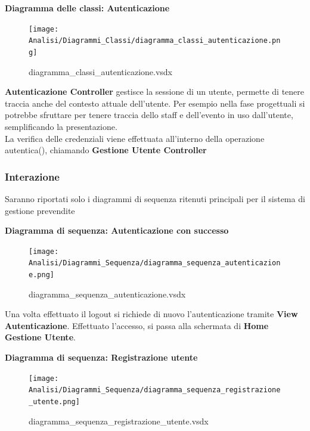 \documentclass[a4paper]{article}
\begin{document}
\newpage

\textbf{Diagramma delle classi: Autenticazione}

\begin{figure}[H]
    \texttt{[image: Analisi/Diagrammi\_Classi/diagramma\_classi\_autenticazione.png]}
    \centering
    \caption{diagramma\_classi\_autenticazione.vsdx}
\end{figure}

\textbf{Autenticazione Controller} gestisce la sessione di un utente, permette di tenere traccia anche del contesto attuale dell'utente. Per esempio nella fase progettuali si potrebbe sfruttare per tenere traccia dello staff e dell'evento in uso dall'utente, semplificando la presentazione.\\ La verifica delle credenziali viene effettuata all'interno della operazione autentica(), chiamando \textbf{Gestione Utente Controller}

\newpage

\subsubsection{Interazione}


Saranno riportati solo i diagrammi di sequenza ritenuti principali per il sistema di gestione prevendite

\textbf{Diagramma di sequenza: Autenticazione con successo}

\begin{figure}[H]
    \texttt{[image: Analisi/Diagrammi\_Sequenza/diagramma\_sequenza\_autenticazione.png]}
    \centering
    \caption{diagramma\_sequenza\_autenticazione.vsdx}
\end{figure}

Una volta effettuato il logout si richiede di nuovo l'autenticazione tramite \textbf{View Autenticazione}. Effettuato l'accesso, si passa alla schermata di \textbf{Home Gestione Utente}.

\textbf{Diagramma di sequenza: Registrazione utente}

\begin{figure}[H]
    \texttt{[image: Analisi/Diagrammi\_Sequenza/diagramma\_sequenza\_registrazione\_utente.png]}
    \centering
    \caption{diagramma\_sequenza\_registrazione\_utente.vsdx}
\end{figure}
\end{document}
